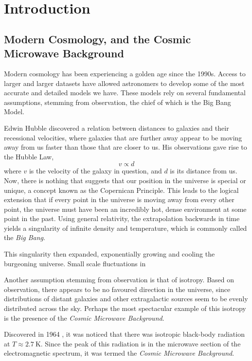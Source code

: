 \chapter{Introduction}
\section{Modern Cosmology, and the Cosmic Microwave Background}
Modern cosmology has been experiencing a golden age since the 1990s. Access to larger and larger datasets have allowed astronomers to develop some of the most accurate and detailed models we have. These models rely on several fundamental assumptions, stemming from observation, the chief of which is the Big Bang Model. 
\par Edwin Hubble discovered a relation between distances to galaxies and their recessional velocities, where galaxies that are further away appear to be moving away from us faster than those that are closer to us. His observations gave rise to the Hubble Law,
\begin{equation}
	v  \varpropto d
	\label{eq:HubbleLaw}
\end{equation}
where $v$ is the velocity of the galaxy in question, and $d$ is its distance from us. Now, there is nothing that suggests that our position in the universe is special or unique, a concept known as the Copernican Principle. This leads to the logical extension that if every point in the universe is moving away from every other point,  the universe must have been an incredibly hot, dense environment at some point in the past. Using general relativity, the extrapolation backwards in time yields a singularity of infinite density and temperature, which is commonly called the \emph{Big Bang}.
\par This singularity then expanded, exponentially growing and cooling the burgeoning universe. Small scale fluctuations in 
\par Another assumption stemming from observation is that of isotropy. Based on observation, there appears to be no favoured direction in the universe, since distributions of distant galaxies and other extragalactic sources seem to be evenly distributed across the sky. Perhaps the most spectacular example of this isotropy is the presence of the \emph{Cosmic Microwave Background}.
\par Discovered in 1964 \citep{Penzias:65}, it was noticed that there was isotropic black-body radiation at $T \approx \SI{2.7}{\kelvin}$. Since the peak of this radiation is in the microwave section of the electromagnetic spectrum, it was termed the \emph{Cosmic Microwave Background}.
